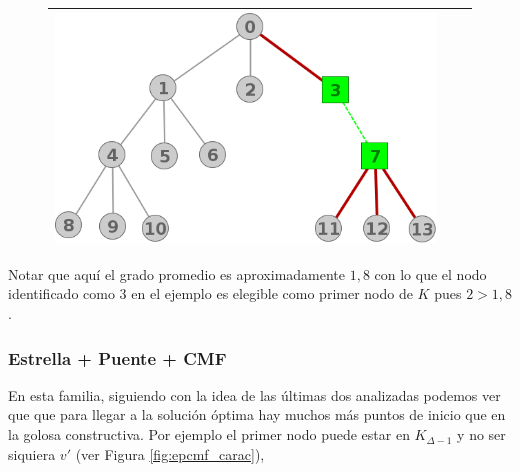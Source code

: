 \begin{figure}[H]
\begin{center}
\begin{tabular}{|c||c||c|}
			\includegraphics[scale = 0.2]{img/ej3/busqueda_local/extremetree_st12.png} \\
		\hline
		\end{tabular}
	\end{center}
\end{figure}
Notar que aqu\'i el grado promedio es aproximadamente $1,8$ con lo que 
el nodo identificado como $3$ en el ejemplo es elegible como
primer nodo de $K$ pues $2 > 1,8$.

\subsubsection{Estrella + Puente + CMF}
En esta familia, siguiendo con la idea de las \'ultimas dos analizadas
podemos ver que que para llegar a la soluci\'on \'optima hay muchos 
m\'as puntos de inicio que en la golosa constructiva. Por ejemplo
el primer nodo puede estar en $K_{\Delta -1}$ y no ser siquiera $v'$ 
(ver Figura \ref{fig:epcmf_carac}), 

